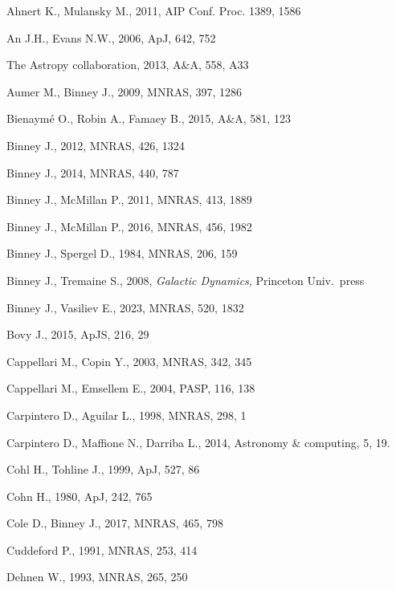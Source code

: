 \documentclass[12pt]{article}
\begin{document}
\begin{thebibliography}{99} \setlength{\parskip}{2pt} \setlength{\itemsep}{2pt}

Ahnert K., Mulansky M., 2011, AIP Conf. Proc. 1389, 1586

An J.H., Evans N.W., 2006, ApJ, 642, 752

The Astropy collaboration, 2013, A\&A, 558, A33

Aumer M., Binney J., 2009, MNRAS, 397, 1286

Bienaym\'e O., Robin A., Famaey B., 2015, A\&A, 581, 123

Binney J., 2012, MNRAS, 426, 1324

Binney J., 2014, MNRAS, 440, 787

Binney J., McMillan P., 2011, MNRAS, 413, 1889

Binney J., McMillan P., 2016, MNRAS, 456, 1982

Binney J., Spergel D., 1984, MNRAS, 206, 159

Binney J., Tremaine S., 2008, \textsl{Galactic Dynamics}, Princeton Univ.\ press

Binney J., Vasiliev E., 2023, MNRAS, 520, 1832

Bovy J., 2015, ApJS, 216, 29

Cappellari M., Copin Y., 2003, MNRAS, 342, 345

Cappellari M., Emsellem E., 2004, PASP, 116, 138

Carpintero D., Aguilar L., 1998, MNRAS, 298, 1

Carpintero D., Maffione N., Darriba L., 2014, Astronomy \& computing, 5, 19.

Cohl H., Tohline J., 1999, ApJ, 527, 86

Cohn H., 1980, ApJ, 242, 765

Cole D., Binney J., 2017, MNRAS, 465, 798

Cuddeford P., 1991, MNRAS, 253, 414

Dehnen W., 1993, MNRAS, 265, 250


\end{thebibliography}
\end{document}
